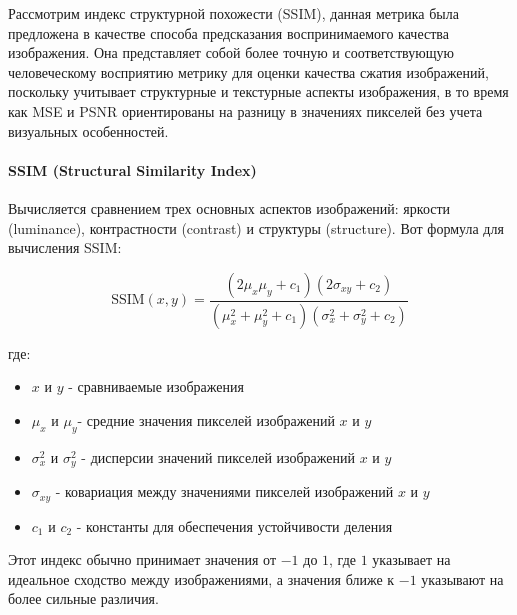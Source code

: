 

Рассмотрим индекс структурной похожести (SSIM), данная метрика была предложена в
качестве способа предсказания воспринимаемого качества изображения. Она
представляет собой более точную и соответствующую человеческому восприятию
метрику для оценки качества сжатия изображений, поскольку учитывает структурные
и текстурные аспекты изображения, в то время как MSE и PSNR ориентированы на
разницу в значениях пикселей без учета визуальных особенностей.


\paragraph{SSIM (Structural Similarity Index)}

Вычисляется сравнением трех основных аспектов изображений: яркости (luminance),
контрастности (contrast) и структуры (structure). Вот формула для вычисления
SSIM:

\begin{equation} \label{eq:img_ssim}
    \text{SSIM}\left(x, y\right) = \frac{
        \left(2\mu_{x}\mu_{y} + c_{1}\right)\left(2\sigma_{xy} + c_{2}\right)
    }{
        \left(\mu_{x}^{2} + \mu_{y}^2 + c_{1}\right)\left(\sigma_{x}^{2} + \sigma_{y}^{2} + c_{2}\right)
    }
\end{equation}

\noindent где:

\begin{itemize}
    \item $x$ и $y$ - сравниваемые изображения
    \item $\mu_{x}$ и $\mu_{y}$​ - средние значения пикселей изображений $x$ и $y$
    \item $\sigma_{x}^{2}$ и $\sigma_{y}^{2}$ - дисперсии значений пикселей изображений $x$ и $y$
    \item $\sigma_{xy}$ - ковариация между значениями пикселей изображений $x$ и $y$
    \item $c_{1}$ и $c_{2}$ - константы для обеспечения устойчивости деления
\end{itemize}


Этот индекс обычно принимает значения от $-1$ до $1$, где $1$ указывает на
идеальное сходство между изображениями, а значения ближе к $-1$ указывают на
более сильные различия.

